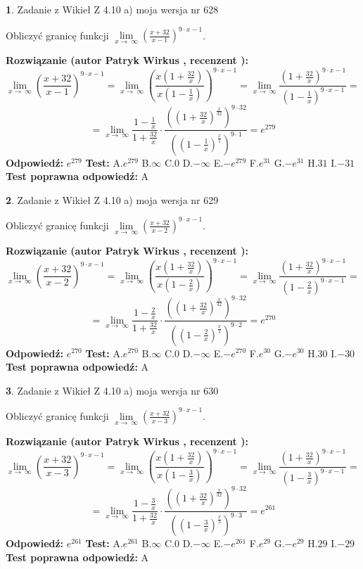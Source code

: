 \documentclass[12pt, a4paper]{article}
\theoremstyle{definition} %
\newtheorem{zad}{}
\newcommand{\zadStart}[1]{\begin{zad}#1\newline}
\newcommand{\zadStop}{\end{zad}}
\newcommand{\rozwStart}[2]{\noindent \textbf{Rozwiązanie (autor #1 , recenzent #2): }\newline}
\newcommand{\rozwStop}{\newline}
\newcommand{\odpStart}{\noindent \textbf{Odpowiedź:}\newline}
\newcommand{\odpStop}{\newline}
\newcommand{\testStart}{\noindent \textbf{Test:}\newline}
\newcommand{\testStop}{\newline}
\newcommand{\kluczStart}{\noindent \textbf{Test poprawna odpowiedź:}\newline}
\newcommand{\kluczStop}{\newline}
\begin{document}
\zadStart{Zadanie z Wikieł Z 4.10 a) moja wersja nr 628}

Obliczyć granicę funkcji  $\lim\limits_{x\to\ \infty}(\frac{x+32}{x-1})^{9\cdot x-1}$.
\zadStop
\rozwStart{Patryk Wirkus}{}
$$\lim\limits_{x\to\ \infty}(\frac{x+32}{x-1})^{9\cdot x-1} = \lim\limits_{x\to\ \infty}(\frac{x(1+\frac{32}{x})}{x(1-\frac{1}{x})})^{9\cdot x-1}=\lim\limits_{x\to\ \infty}\frac{(1+\frac{32}{x})^{9\cdot x-1}}{(1-\frac{1}{x})^{9\cdot x-1}}=$$
$$=\lim\limits_{x\to\ \infty}\frac{1-\frac{1}{x}}{1+\frac{32}{x}}\cdot\frac{((1+\frac{32}{x})^{\frac{x}{32}})^{9\cdot32}}{((1-\frac{1}{x})^{\frac{x}{1}})^{9\cdot1}}=e^{279}$$
\rozwStop
\odpStart
$e^{279}$
\odpStop
\testStart
A.$e^{279}$ B.$\infty$ C.$0$ D.$-\infty$ E.$-e^{279}$
F.$e^{31}$ G.$-e^{31}$
H.$31$
I.$-31$
\testStop
\kluczStart
A
\kluczStop



\zadStart{Zadanie z Wikieł Z 4.10 a) moja wersja nr 629}

Obliczyć granicę funkcji  $\lim\limits_{x\to\ \infty}(\frac{x+32}{x-2})^{9\cdot x-1}$.
\zadStop
\rozwStart{Patryk Wirkus}{}
$$\lim\limits_{x\to\ \infty}(\frac{x+32}{x-2})^{9\cdot x-1} = \lim\limits_{x\to\ \infty}(\frac{x(1+\frac{32}{x})}{x(1-\frac{2}{x})})^{9\cdot x-1}=\lim\limits_{x\to\ \infty}\frac{(1+\frac{32}{x})^{9\cdot x-1}}{(1-\frac{2}{x})^{9\cdot x-1}}=$$
$$=\lim\limits_{x\to\ \infty}\frac{1-\frac{2}{x}}{1+\frac{32}{x}}\cdot\frac{((1+\frac{32}{x})^{\frac{x}{32}})^{9\cdot32}}{((1-\frac{2}{x})^{\frac{x}{2}})^{9\cdot2}}=e^{270}$$
\rozwStop
\odpStart
$e^{270}$
\odpStop
\testStart
A.$e^{270}$ B.$\infty$ C.$0$ D.$-\infty$ E.$-e^{270}$
F.$e^{30}$ G.$-e^{30}$
H.$30$
I.$-30$
\testStop
\kluczStart
A
\kluczStop



\zadStart{Zadanie z Wikieł Z 4.10 a) moja wersja nr 630}

Obliczyć granicę funkcji  $\lim\limits_{x\to\ \infty}(\frac{x+32}{x-3})^{9\cdot x-1}$.
\zadStop
\rozwStart{Patryk Wirkus}{}
$$\lim\limits_{x\to\ \infty}(\frac{x+32}{x-3})^{9\cdot x-1} = \lim\limits_{x\to\ \infty}(\frac{x(1+\frac{32}{x})}{x(1-\frac{3}{x})})^{9\cdot x-1}=\lim\limits_{x\to\ \infty}\frac{(1+\frac{32}{x})^{9\cdot x-1}}{(1-\frac{3}{x})^{9\cdot x-1}}=$$
$$=\lim\limits_{x\to\ \infty}\frac{1-\frac{3}{x}}{1+\frac{32}{x}}\cdot\frac{((1+\frac{32}{x})^{\frac{x}{32}})^{9\cdot32}}{((1-\frac{3}{x})^{\frac{x}{3}})^{9\cdot3}}=e^{261}$$
\rozwStop
\odpStart
$e^{261}$
\odpStop
\testStart
A.$e^{261}$ B.$\infty$ C.$0$ D.$-\infty$ E.$-e^{261}$
F.$e^{29}$ G.$-e^{29}$
H.$29$
I.$-29$
\testStop
\kluczStart
A
\kluczStop
\end{document}

